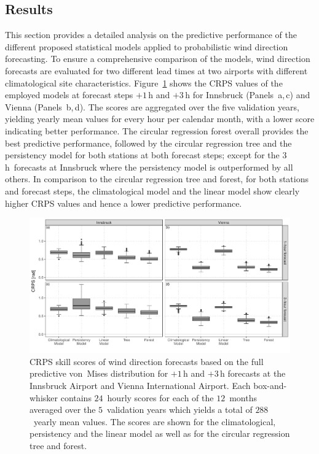 \documentclass[nojss,shortnames]{jss}
\numberwithin{equation}{section}
\begin{document}
\subsection{Results} 
This section provides a detailed analysis on the predictive performance of the
different proposed statistical models applied to probabilistic wind direction
forecasting. To ensure a comprehensive comparison of the models, wind direction
forecasts are evaluated for two different lead times at two airports with
different climatological site characteristics.
Figure~\ref{fig:boxplot_crpsraw} shows the CRPS values of the employed models
at forecast steps $+1$\,h and $+3$\,h for Innsbruck (Panels~a,\,c) and Vienna
(Panels~b,\,d). The scores are aggregated over the five validation years,
yielding yearly mean values for every hour per calendar month, with a lower
score indicating better performance. The circular regression forest overall
provides the best predictive performance, followed by the circular regression
tree and the persistency model for both stations at both forecast steps; except
for the $3$\,h~forecasts at Innsbruck where the persistency model is
outperformed by all others. In comparison to the circular regression tree and
forest, for both stations and forecast steps, the climatological model and the
linear model show clearly higher CRPS values and hence a lower predictive
performance.
\begin{figure}[t]
  \centering
  \includegraphics{_plot_circforest_validation_crpsraw_agg_comparison_with_lowff_v14b.pdf}
  \caption{CRPS skill scores of wind direction forecasts based on the full
    predictive von~Mises distribution for $+1$\,h and $+3$\,h forecasts at the
    Innsbruck Airport and Vienna International Airport. Each box-and-whisker contains $24$~hourly scores
    for each of the $12$~months averaged over the $5$~validation years which
    yields a total of $288$~yearly mean values. The scores are shown for the
    climatological, persistency and the linear model as well as for the circular
    regression tree and forest.}
  \label{fig:boxplot_crpsraw} 
\end{figure}
\end{document}
